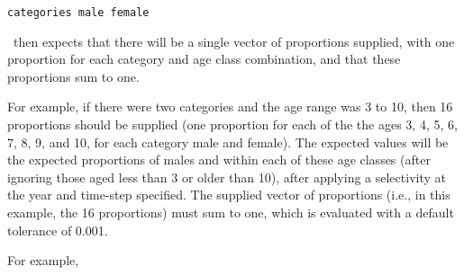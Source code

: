 {\small{\begin{verbatim}
categories male female
\end{verbatim}}}

\CNAME\ then expects that there will be a single vector of proportions supplied, with one proportion for each category and age class combination, and that these proportions sum to one. 

For example, if there were two categories and the age range was 3 to 10, then 16 proportions should be supplied (one proportion for each of the the ages 3, 4, 5, 6, 7, 8, 9, and 10, for each category male and female). The expected values will be the expected proportions of males and within each of these age classes (after ignoring those aged less than 3 or older than 10), after applying a selectivity at the year and time-step specified. The supplied vector of proportions (i.e., in this example, the 16 proportions) must sum to one, which is evaluated with a default tolerance of 0.001. 

For example,


